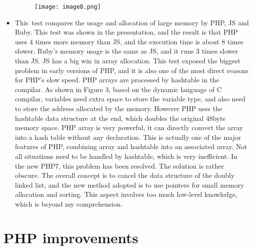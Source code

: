 \documentclass[12pt]{report}
\renewcommand{\_}{\kern-1.5pt\textunderscore\kern-1.5pt}
\begin{document}
\begin{multicols}{2}
\begin{itemize}
\begin{Center}
 \tabto{0.2in} 
\end{Center}

\begin{figure}[H]
	\begin{Center}
		\texttt{[image: image8.png]}
	\end{Center}
\end{figure}

\vspace{\baselineskip}	\item {\fontsize{10pt}{12.0pt}\selectfont This\ test compares the usage and allocation of large memory by PHP, JS and Ruby. This test was shown in the presentation, and the result is that PHP uses 4 times more memory than JS, and the execution time is about 8 times slower. Ruby's memory usage is the same as JS, and it runs 3 times slower than JS. JS has a big win in array allocation. This test exposed the biggest problem in early versions of PHP, and it is also one of the most direct reasons for PHP's slow speed. PHP arrays are processed by hashtable in the compilar. As shown in Figure 3, based on the dynamic language of C compilar, variables need extra space to store the variable type, and also need to store the address allocated by the memory. However PHP uses the hashtable data structure at the end, which doubles the original 48byte memory space.  PHP array is very powerful, it can directly convert the array into a hash table without any declaration. This is actually one of the major features of PHP, combining array and hashtable into an associated array. Not all situations need to be handled by hashtable, which is very inefficient. In the new PHP7, this problem has been resolved. The solution is rather obscure. The overall concept is to cancel the data structure of the doubly linked list, and the new method adopted is to use pointers for small memory allocation and sorting. This aspect involves too much low-level knowledge, which is beyond my comprehension.\par}
\end{itemize}

\vspace{\baselineskip}\setlength{\parskip}{3.96pt}
\section{PHP improvements }


\end{multicols}
\end{document}
